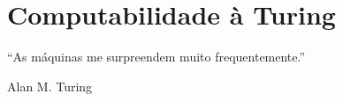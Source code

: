 \chapter{Computabilidade à Turing}\label{cap:TuringComputabildiade}

\epigraph{``As máquinas me surpreendem muito frequentemente.''}{Alan M. Turing}